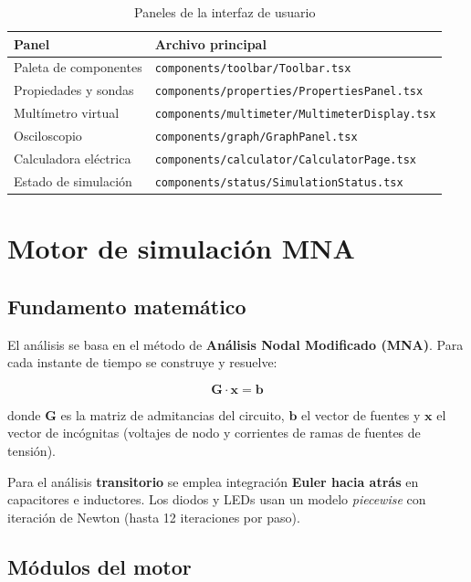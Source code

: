 \documentclass[12pt,a4paper]{article}
\begin{document}
\begin{table}[H]
  \centering
  \begin{tabularx}{\textwidth}{lX}
    \toprule
    \textbf{Panel} & \textbf{Archivo principal} \\
    \midrule
    Paleta de componentes & \texttt{components/toolbar/Toolbar.tsx} \\
    Propiedades y sondas & \texttt{components/properties/PropertiesPanel.tsx} \\
    Multímetro virtual & \texttt{components/multimeter/MultimeterDisplay.tsx} \\
    Osciloscopio & \texttt{components/graph/GraphPanel.tsx} \\
    Calculadora eléctrica & \texttt{components/calculator/CalculatorPage.tsx} \\
    Estado de simulación & \texttt{components/status/SimulationStatus.tsx} \\
    \bottomrule
  \end{tabularx}
  \caption{Paneles de la interfaz de usuario}
\end{table}

\section{Motor de simulación MNA}

\subsection{Fundamento matemático}

El análisis se basa en el método de \textbf{Análisis Nodal Modificado (MNA)}. Para cada instante de tiempo se construye y resuelve:

\begin{equation}
  \mathbf{G} \cdot \mathbf{x} = \mathbf{b}
\end{equation}

donde $\mathbf{G}$ es la matriz de admitancias del circuito, $\mathbf{b}$ el vector de fuentes y $\mathbf{x}$ el vector de incógnitas (voltajes de nodo y corrientes de ramas de fuentes de tensión).

Para el análisis \textbf{transitorio} se emplea integración \textbf{Euler hacia atrás} en capacitores e inductores. Los diodos y LEDs usan un modelo \textit{piecewise} con iteración de Newton (hasta 12 iteraciones por paso).

\subsection{Módulos del motor}
\end{document}
